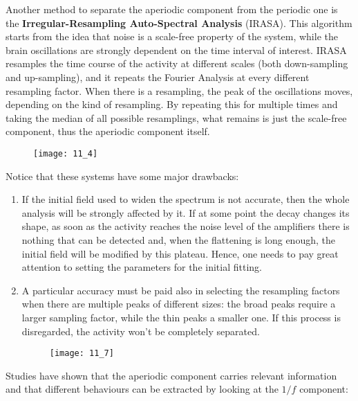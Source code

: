 Another method to separate the aperiodic component from the periodic one is the
\textbf{Irregular-Resampling Auto-Spectral Analysis} (IRASA). This algorithm starts from the idea
that noise is a scale-free property of the system, while the brain oscillations are strongly dependent on the
time interval of interest. IRASA resamples the time course of the activity at different scales (both
down-sampling and up-sampling), and it repeats the Fourier Analysis at every different resampling factor.
When there is a resampling, the peak of the oscillations moves, depending on the kind of resampling. By repeating
this for multiple times and taking the median of all possible resamplings, what remains is just the
scale-free component, thus the aperiodic component itself.
\begin{figure}[H]
    \texttt{[image: 11\_4]}
    \centering
\end{figure}
Notice that these systems have some major drawbacks:
\begin{enumerate}
    \item If the initial field used to widen the spectrum is not accurate, then the whole analysis will be
          strongly affected by it. If at some point the decay changes its shape, as soon as the activity
          reaches the noise level of the amplifiers there is nothing that can be detected and, when the
          flattening is long enough, the initial field will be modified by this plateau. Hence, one needs to
          pay great attention to setting the parameters for the initial fitting.
    \item A particular accuracy must be paid also in selecting the resampling factors when there are multiple
          peaks of different sizes: the broad peaks require a larger sampling factor, while the thin peaks a
          smaller one. If this process is disregarded, the activity won't be completely separated.
          \begin{figure}[H]
              \texttt{[image: 11\_7]}
              \centering
          \end{figure}
\end{enumerate}
Studies have shown that the aperiodic component carries relevant information and that different behaviours
can be extracted by looking at the \(1/f\) component:
